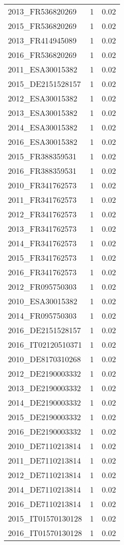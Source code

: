 \begin{table*}[htbp]
\begin{tabular}{lrr}
2013_FR536820269 & 1 & 0.02 \\
2015_FR536820269 & 1 & 0.02 \\
2013_FR414945089 & 1 & 0.02 \\
2016_FR536820269 & 1 & 0.02 \\
2011_ESA30015382 & 1 & 0.02 \\
2015_DE2151528157 & 1 & 0.02 \\
2012_ESA30015382 & 1 & 0.02 \\
2013_ESA30015382 & 1 & 0.02 \\
2014_ESA30015382 & 1 & 0.02 \\
2016_ESA30015382 & 1 & 0.02 \\
2015_FR388359531 & 1 & 0.02 \\
2016_FR388359531 & 1 & 0.02 \\
2010_FR341762573 & 1 & 0.02 \\
2011_FR341762573 & 1 & 0.02 \\
2012_FR341762573 & 1 & 0.02 \\
2013_FR341762573 & 1 & 0.02 \\
2014_FR341762573 & 1 & 0.02 \\
2015_FR341762573 & 1 & 0.02 \\
2016_FR341762573 & 1 & 0.02 \\
2012_FR095750303 & 1 & 0.02 \\
2010_ESA30015382 & 1 & 0.02 \\
2014_FR095750303 & 1 & 0.02 \\
2016_DE2151528157 & 1 & 0.02 \\
2016_IT02120510371 & 1 & 0.02 \\
2010_DE8170310268 & 1 & 0.02 \\
2012_DE2190003332 & 1 & 0.02 \\
2013_DE2190003332 & 1 & 0.02 \\
2014_DE2190003332 & 1 & 0.02 \\
2015_DE2190003332 & 1 & 0.02 \\
2016_DE2190003332 & 1 & 0.02 \\
2010_DE7110213814 & 1 & 0.02 \\
2011_DE7110213814 & 1 & 0.02 \\
2012_DE7110213814 & 1 & 0.02 \\
2014_DE7110213814 & 1 & 0.02 \\
2016_DE7110213814 & 1 & 0.02 \\
2015_IT01570130128 & 1 & 0.02 \\
2016_IT01570130128 & 1 & 0.02 \\

\end{tabular}
\end{table*}
